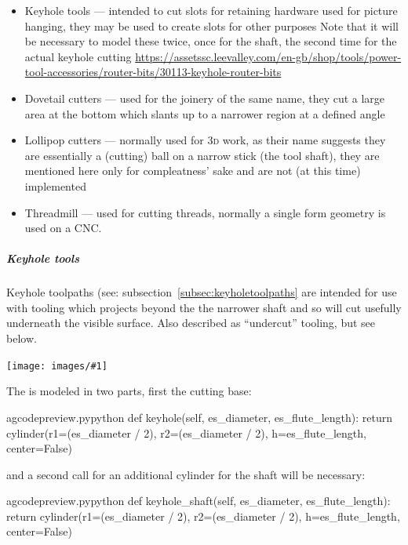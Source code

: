 \documentclass{ltxdoc}
\newcommand{\includeimage}[1]{\bigskip\noindent\texttt{[image: images/\#1]}\bigskip}
\begin{document}
\begin{itemize}
\item Keyhole tools --- intended to cut slots for retaining hardware used for picture
                        hanging, they may be used to create slots for other purposes
                        Note that it will be necessary to model these twice, once for
                        the shaft, the second time for the actual keyhole cutting
                        \url{https://assetssc.leevalley.com/en-gb/shop/tools/power-tool-accessories/router-bits/30113-keyhole-router-bits}
\item Dovetail cutters --- used for the joinery of the same name, they cut a large
                           area at the bottom which slants up to a narrower region
                           at a defined angle
\item Lollipop cutters --- normally used for \textsc{3d} work, as their name suggests they are
                           essentially a (cutting) ball on a narrow stick (the tool shaft),
                           they are mentioned here only for compleatness' sake and are not
                           (at this time) implemented
\item Threadmill --- used for cutting threads, normally a single form geometry is used on a CNC.
\end{itemize}

\subparagraph{Keyhole tools}

Keyhole toolpaths (see: subsection~\ref{subsec:keyholetoolpaths} are intended for use with tooling which projects beyond the the narrower shaft and so will cut usefully underneath the visible surface. Also described as ``undercut'' tooling, but see below.

\includeimage{keyhole_router_bits.pdf}%

The  is modeled in two parts, first the cutting base:

\lstset{firstnumber=\thegcpy}
\begin{writecode}{a}{gcodepreview.py}{python}
    def keyhole(self, es_diameter, es_flute_length):
        return cylinder(r1=(es_diameter / 2), r2=(es_diameter / 2), h=es_flute_length, center=False)

\end{writecode}
\addtocounter{gcpy}{3}

\noindent and a second call for an additional cylinder for the shaft will be necessary:

\lstset{firstnumber=\thegcpy}
\begin{writecode}{a}{gcodepreview.py}{python}
    def keyhole_shaft(self, es_diameter, es_flute_length):
        return cylinder(r1=(es_diameter / 2), r2=(es_diameter / 2), h=es_flute_length, center=False)

\end{writecode}
\addtocounter{gcpy}{3}
\end{document}
